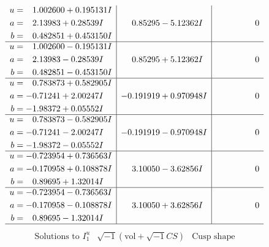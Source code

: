 \documentclass[1p]{elsarticle_modified}
\theoremstyle{definition}
\newcommand{\I}{\sqrt{-1}}
\begin{document}
$$\begin{array}{c|c|c}
\begin{aligned}
u &= \phantom{-}1.002600 + 0.195131 I \\
a &= \phantom{-}2.13983 + 0.28539 I \\
b &= \phantom{-}0.482851 + 0.453150 I\end{aligned}
 & \phantom{-}0.85295 - 5.12362 I & \phantom{-0.000000 } 0 \\ \hline\begin{aligned}
u &= \phantom{-}1.002600 - 0.195131 I \\
a &= \phantom{-}2.13983 - 0.28539 I \\
b &= \phantom{-}0.482851 - 0.453150 I\end{aligned}
 & \phantom{-}0.85295 + 5.12362 I & \phantom{-0.000000 } 0 \\ \hline\begin{aligned}
u &= \phantom{-}0.783873 + 0.582905 I \\
a &= -0.71241 + 2.00247 I \\
b &= -1.98372 + 0.05552 I\end{aligned}
 & -0.191919 + 0.970948 I & \phantom{-0.000000 } 0 \\ \hline\begin{aligned}
u &= \phantom{-}0.783873 - 0.582905 I \\
a &= -0.71241 - 2.00247 I \\
b &= -1.98372 - 0.05552 I\end{aligned}
 & -0.191919 - 0.970948 I & \phantom{-0.000000 } 0 \\ \hline\begin{aligned}
u &= -0.723954 + 0.736563 I \\
a &= -0.170958 + 0.108878 I \\
b &= \phantom{-}0.89695 + 1.32014 I\end{aligned}
 & \phantom{-}3.10050 - 3.62856 I & \phantom{-0.000000 } 0 \\ \hline\begin{aligned}
u &= -0.723954 - 0.736563 I \\
a &= -0.170958 - 0.108878 I \\
b &= \phantom{-}0.89695 - 1.32014 I\end{aligned}
 & \phantom{-}3.10050 + 3.62856 I & \phantom{-0.000000 } 0\\
 \hline 
 \end{array}$$\newpage$$\begin{array}{c|c|c}  
\text{Solutions to }I^u_{1}& \I (\text{vol} + \sqrt{-1}CS) & \text{Cusp shape}\\
 \hline 
\begin{aligned}

\end{aligned}
\end{array}$$
\end{document}
